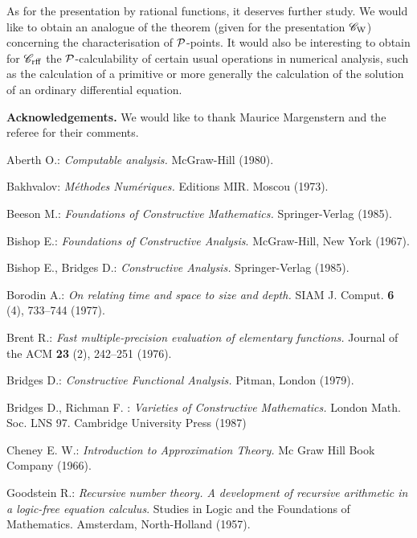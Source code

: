 As for the presentation by rational functions, it deserves further study. We would like to obtain an analogue of the theorem (given for the presentation ${{{\mathscr C}}_{\rm W}}$) concerning the characterisation of ${\cal P}$-points.
It would also be interesting to obtain for ${{{\mathscr C}}_{\rm rff}}$ the ${\cal P}$-calculability of certain usual operations in numerical analysis, such as the calculation of a primitive or more generally the calculation of the solution of an ordinary differential equation. 

\bni
{\bf Acknowledgements.}
We would like to thank Maurice Margenstern and the referee for their comments.

\begin{thebibliography}{50}


 Aberth O.: {\em Computable analysis.}
McGraw-Hill (1980).

 Bakhvalov: {\em Méthodes Numériques.} Editions MIR. Moscou 
(1973).

 Beeson M.: {\em Foundations of Constructive Mathematics.} Springer-Verlag (1985).

 Bishop E.: {\em Foundations of Constructive Analysis}. McGraw-Hill, New York  (1967).

 Bishop E., Bridges D.: {\em Constructive Analysis.} Springer-Verlag (1985).

 Borodin A.: {\em On relating time and space to size and depth.}
SIAM J. Comput. {\bf 6} (4), 733--744 (1977).

 Brent R.: {\em Fast multiple-precision evaluation of elementary functions.} Journal of the ACM {\bf 23} (2), 242--251 (1976).

 Bridges D.: {\em Constructive Functional Analysis.} Pitman, London (1979).

 Bridges D., Richman F. : {\em Varieties of Constructive 
Mathematics.} London Math. Soc. LNS 97. Cambridge University Press (1987)

 Cheney E. W.: {\em Introduction to Approximation Theory.}
 Mc Graw Hill Book Company (1966).

 Goodstein R.: {\em Recursive number theory. A development of recursive arithmetic in a logic-free equation calculus}. Studies in Logic and the Foundations of Mathematics. Amsterdam, North-Holland  (1957).


\end{thebibliography}
